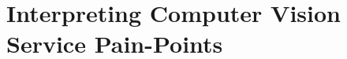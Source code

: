 \chapter[Interpreting Computer Vision Service Pain-Points]
{Interpreting Computer Vision Service Pain-Points}
\label{ch:icse2020}
\graphicspath{{mainmatter/publications/figures/icse2020/}}
